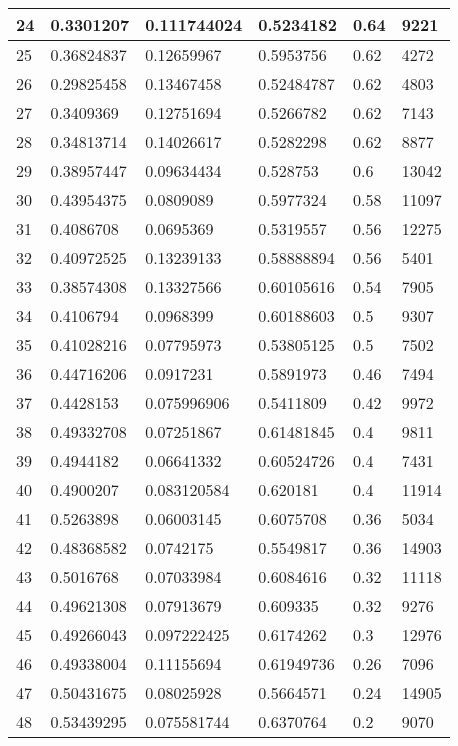 \begin{longtable}{|l|l|l|l|l|l|}
24 & 0.3301207 & 0.111744024 & 0.5234182 & 0.64 & 9221 \\ \hline 
25 & 0.36824837 & 0.12659967 & 0.5953756 & 0.62 & 4272 \\ \hline 
26 & 0.29825458 & 0.13467458 & 0.52484787 & 0.62 & 4803 \\ \hline 
27 & 0.3409369 & 0.12751694 & 0.5266782 & 0.62 & 7143 \\ \hline 
28 & 0.34813714 & 0.14026617 & 0.5282298 & 0.62 & 8877 \\ \hline 
29 & 0.38957447 & 0.09634434 & 0.528753 & 0.6 & 13042 \\ \hline 
30 & 0.43954375 & 0.0809089 & 0.5977324 & 0.58 & 11097 \\ \hline 
31 & 0.4086708 & 0.0695369 & 0.5319557 & 0.56 & 12275 \\ \hline 
32 & 0.40972525 & 0.13239133 & 0.58888894 & 0.56 & 5401 \\ \hline 
33 & 0.38574308 & 0.13327566 & 0.60105616 & 0.54 & 7905 \\ \hline 
34 & 0.4106794 & 0.0968399 & 0.60188603 & 0.5 & 9307 \\ \hline 
35 & 0.41028216 & 0.07795973 & 0.53805125 & 0.5 & 7502 \\ \hline 
36 & 0.44716206 & 0.0917231 & 0.5891973 & 0.46 & 7494 \\ \hline 
37 & 0.4428153 & 0.075996906 & 0.5411809 & 0.42 & 9972 \\ \hline 
38 & 0.49332708 & 0.07251867 & 0.61481845 & 0.4 & 9811 \\ \hline 
39 & 0.4944182 & 0.06641332 & 0.60524726 & 0.4 & 7431 \\ \hline 
40 & 0.4900207 & 0.083120584 & 0.620181 & 0.4 & 11914 \\ \hline 
41 & 0.5263898 & 0.06003145 & 0.6075708 & 0.36 & 5034 \\ \hline 
42 & 0.48368582 & 0.0742175 & 0.5549817 & 0.36 & 14903 \\ \hline 
43 & 0.5016768 & 0.07033984 & 0.6084616 & 0.32 & 11118 \\ \hline 
44 & 0.49621308 & 0.07913679 & 0.609335 & 0.32 & 9276 \\ \hline 
45 & 0.49266043 & 0.097222425 & 0.6174262 & 0.3 & 12976 \\ \hline 
46 & 0.49338004 & 0.11155694 & 0.61949736 & 0.26 & 7096 \\ \hline 
47 & 0.50431675 & 0.08025928 & 0.5664571 & 0.24 & 14905 \\ \hline 
48 & 0.53439295 & 0.075581744 & 0.6370764 & 0.2 & 9070 \\ \hline 

\end{longtable}
